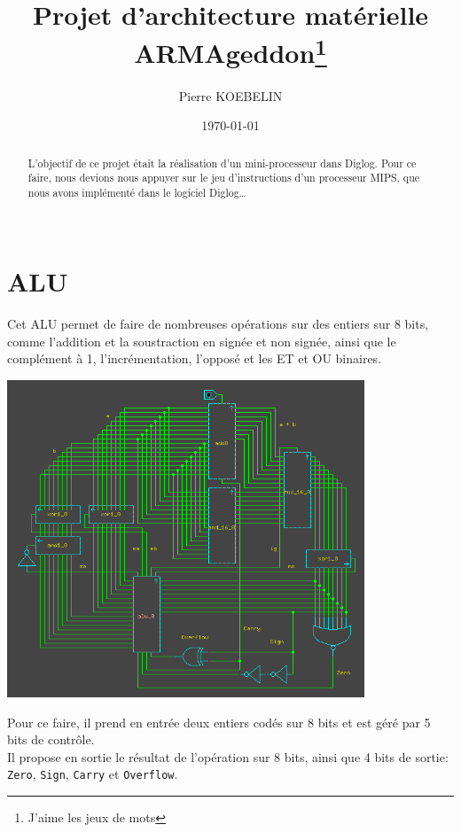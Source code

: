 \documentclass[11pt, a4paper, twoside, titlepage]{article}
\begin{document}
\title{{\titlefont Projet d'architecture matérielle}\\ARMAgeddon\thanks{J'aime les jeux de mots}}
\author{Pierre KOEBELIN}
\date{\today} 
\maketitle


\begin{abstract}

	L’objectif de ce projet était la réalisation d’un mini-processeur dans Diglog. Pour ce faire, nous devions nous appuyer sur le jeu d'instructions d'un processeur MIPS, que nous avons implémenté dans le logiciel Diglog\ldots\\
\\

\end{abstract}

\tableofcontents

\newpage
\section{ALU}
	Cet ALU permet de faire de nombreuses opérations sur des entiers sur 8 bits, comme l'addition et la soustraction en signée et non signée, ainsi que le complément à 1, l'incrémentation, l'opposé et les ET et OU binaires.\\
	\begin{center}
		\centerline{\includegraphics[width=0.8\textwidth]{alu_8}}
	\end{center}
	Pour ce faire, il prend en entrée deux entiers codés sur 8 bits et est géré par 5 bits de contrôle.\\
	Il propose en sortie le résultat de l'opération sur 8 bits, ainsi que 4 bits de sortie: \texttt{Zero}, \texttt{Sign}, \texttt{Carry} et \texttt{Overflow}.
\end{document}
